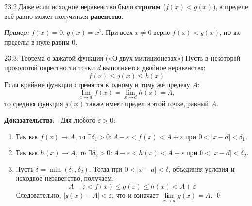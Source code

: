 \documentclass[a4paper,12pt]{article}
\newcommand{\myproof}{\textbf{Доказательство.}\ }
\begin{document}
	
	\vspace{0.5cm}
	\begin{remarkbox}{23.2}
		Даже если исходное неравенство было \textbf{строгим} ($f(x) < g(x)$), в пределе всё равно может получиться \textbf{равенство}.
		
		\textit{Пример:} $f(x) = 0$, $g(x) = x^2$. При всех $x \neq 0$ верно $f(x) < g(x)$, но их пределы в нуле равны $0$.
	\end{remarkbox}
	
	\vspace{0.5cm}
	\begin{theorembox}{23.3: Теорема о зажатой функции («О двух милиционерах»)}
		Пусть в некоторой проколотой окрестности точки $d$ выполняется двойное неравенство:
		\[ f(x) \le g(x) \le h(x) \]
		Если крайние функции стремятся к одному и тому же пределу $A$:
		\[ \lim_{x \to d} f(x) = \lim_{x \to d} h(x) = A, \]
		то средняя функция $g(x)$ также имеет предел в этой точке, равный $A$.
	\end{theorembox}
	
	\vspace{0.5cm}
	\myproof
	Для любого $\varepsilon > 0$:
	\begin{enumerate}
		\item Так как $f(x) \to A$, то $\exists \delta_1 > 0 \colon A - \varepsilon < f(x) < A + \varepsilon$ при $0 < |x-d| < \delta_1$.
		\item Так как $h(x) \to A$, то $\exists \delta_2 > 0 \colon A - \varepsilon < h(x) < A + \varepsilon$ при $0 < |x-d| < \delta_2$.
		\item Пусть $\delta = \min(\delta_1, \delta_2)$. Тогда при $0 < |x-d| < \delta$, объединяя условия и исходное неравенство, получаем:
		\[ A - \varepsilon < f(x) \le g(x) \le h(x) < A + \varepsilon \]
		Следовательно, $|g(x) - A| < \varepsilon$, что и означает $\lim\limits_{x \to d} g(x) = A$. \qed
	\end{enumerate}
	
	\begin{center}
	\end{center}
	
\end{document}

